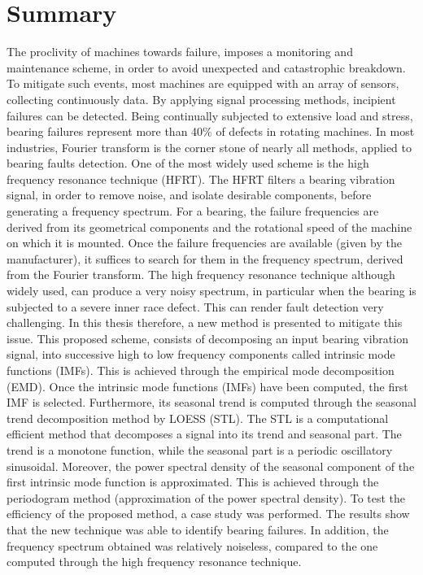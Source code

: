 \documentclass[../Main/thesis.tex]{subfiles}
\begin{document}
	\section{Summary}
	\label{sec:summary_and_conclusions}
	 The proclivity of machines towards failure, imposes a monitoring and maintenance scheme, in order to avoid unexpected and catastrophic breakdown. To mitigate such events, most machines are equipped with an array of sensors, collecting continuously data. By applying signal processing methods, incipient failures can be detected.
	\justify
	 Being continually subjected to extensive load and stress, bearing failures represent more than 40$\%$ of defects in rotating machines. In most industries, Fourier transform is the corner stone of nearly all methods, applied to bearing faults detection.
	One of the most widely used scheme is the high frequency resonance technique (HFRT). 
	The HFRT filters a bearing vibration signal, in order to remove noise, and isolate desirable components, before generating a frequency spectrum. For a bearing, the failure frequencies are derived from its geometrical components and the rotational speed of the machine on which it is mounted. Once the failure frequencies are available (given by the manufacturer), it suffices to search for them in the frequency spectrum, derived from the Fourier transform. 
	\justify
	The high frequency resonance technique although widely used, can produce a very noisy spectrum, in particular when the bearing is subjected to a severe inner race defect. This can render fault detection very challenging. In this thesis therefore, a new method is presented to mitigate this issue.
	This proposed scheme, consists of decomposing an input bearing vibration signal, into successive high to low frequency components called intrinsic mode functions (IMFs). This is achieved through the empirical mode decomposition (EMD).
	\justify
	Once the intrinsic mode functions (IMFs) have been computed, the first IMF is selected. Furthermore, its seasonal trend is computed through the seasonal trend decomposition method by LOESS (STL). The STL is a computational efficient method that decomposes a signal into its trend and seasonal part. The trend is a monotone function, while the seasonal part is a periodic oscillatory sinusoidal. Moreover, the power spectral density of the seasonal component of the first intrinsic mode function is approximated. This is achieved through the periodogram method (approximation of the power spectral density). 
	To test the efficiency of the proposed method, a case study was performed. The results show that the new technique was able to identify bearing failures. In addition, the frequency spectrum obtained was relatively noiseless, compared to the one computed through the high frequency resonance technique.
\end{document}

